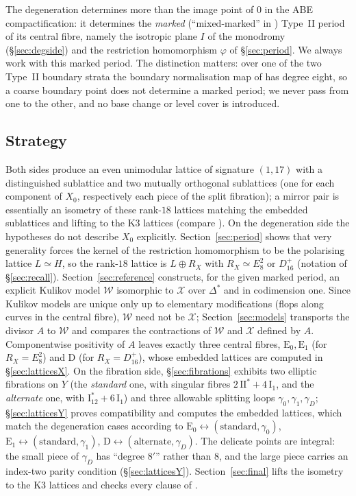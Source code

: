 \documentclass[11pt]{article}
\newcommand{\calX}{\mathcal X}
\newcommand{\calW}{\mathcal W}
\newcommand{\II}{\mathrm{II}}
\newcommand{\I}{\mathrm{I}}
\theoremstyle{definition}
\theoremstyle{remark}
\begin{document}
The degeneration determines more than the image point of \(0\) in the
ABE compactification: it determines the \emph{marked} (``mixed-marked''
in \cite{AE}) Type~II period of its central fibre, namely the isotropic
plane \(I\) of the monodromy (\S\ref{sec:degside}) and the restriction
homomorphism \(\varphi\) of \S\ref{sec:period}. We always work with
this marked period. The distinction matters: over one of the two
Type~II boundary strata the boundary normalisation map of
\cite[Theorem~7.58]{ABE} has degree eight, so a coarse boundary point
does not determine a marked period; we never pass from one to the
other, and no base change or level cover is introduced.

\subsection{Strategy}\label{sec:strategy}

Both sides produce an even unimodular lattice of signature \((1,17)\)
with a distinguished sublattice and two mutually orthogonal sublattices
(one for each component of \(X_0\), respectively each piece of the
split fibration); a mirror pair is essentially an isometry of these
rank-\(18\) lattices matching the embedded sublattices and lifting to
the K3 lattices (compare \cite[Proposition~5.3]{GT}). On the
degeneration side the hypotheses do not describe \(X_0\) explicitly.
Section~\ref{sec:period} shows that very generality forces
the kernel of the restriction homomorphism to be the polarising
lattice \(L\simeq H\), so the rank-\(18\) lattice is \(L\oplus R_X\)
with \(R_X\simeq E_8^2\) or \(D_{16}^+\) (notation of
\S\ref{sec:recall}). Section~\ref{sec:reference} constructs, for the
given marked period, an explicit Kulikov model \(\calW\) isomorphic to
\(\calX\) over \(\Delta^*\) and in codimension one. Since Kulikov
models are unique only up to elementary modifications (flops along
curves in the central fibre), \(\calW\) need not be \(\calX\);
Section~\ref{sec:models}
transports the divisor \(A\) to \(\calW\) and compares the contractions
of \(\calW\) and \(\calX\) defined by \(A\). Componentwise positivity
of \(A\) leaves exactly three central fibres, \(\mathrm E_0,\mathrm E_1\)
(for \(R_X=E_8^2\)) and \(\mathrm D\) (for \(R_X=D_{16}^+\)), whose
embedded lattices are computed in \S\ref{sec:latticesX}. On the
fibration side, \S\ref{sec:fibrations} exhibits two elliptic
fibrations on \(Y\) (the \emph{standard} one, with singular fibres
\(2\,\II^*+4\,\I_1\), and the \emph{alternate} one, with
\(\I_{12}^*+6\,\I_1\)) and three allowable splitting loops
\(\gamma_0,\gamma_1,\gamma_D\); \S\ref{sec:latticesY} proves
compatibility and computes the embedded lattices, which match the
degeneration cases according to
\(\mathrm E_0\leftrightarrow(\text{standard},\gamma_0)\),
\(\mathrm E_1\leftrightarrow(\text{standard},\gamma_1)\),
\(\mathrm D\leftrightarrow(\text{alternate},\gamma_D)\).
The delicate points are integral: the small piece of \(\gamma_D\) has
``degree \(8'\)'' rather than \(8\), and the large piece carries an
index-two parity condition (\S\ref{sec:latticesY}).
Section~\ref{sec:final} lifts the isometry to the K3 lattices and
checks every clause of \cite[Definition~5.1]{GT}.
\end{document}
